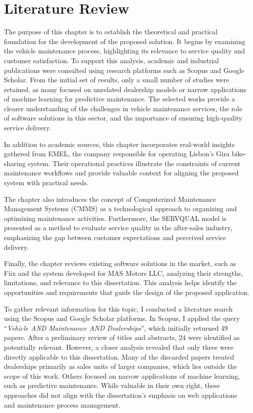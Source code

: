 \chapter{Literature Review}%
\label{chapter:literatureReview}

\begin{introduction}
The purpose of this chapter is to establish the theoretical and practical foundation for the development of the proposed solution. It begins by examining the vehicle maintenance process, highlighting its relevance to service quality and customer satisfaction. To support this analysis, academic and industrial publications were consulted using research platforms such as Scopus and Google Scholar. From the initial set of results, only a small number of studies were retained, as many focused on unrelated dealership models or narrow applications of machine learning for predictive maintenance. The selected works provide a clearer understanding of the challenges in vehicle maintenance services, the role of software solutions in this sector, and the importance of ensuring high-quality service delivery.

In addition to academic sources, this chapter incorporates real-world insights gathered from EMEL, the company responsible for operating Lisbon's Gira bike-sharing system. Their operational practices illustrate the constraints of current maintenance workflows and provide valuable context for aligning the proposed system with practical needs.

The chapter also introduces the concept of Computerized Maintenance Management Systems (CMMS) as a technological approach to organizing and optimizing maintenance activities. Furthermore, the SERVQUAL model is presented as a method to evaluate service quality in the after-sales industry, emphasizing the gap between customer expectations and perceived service delivery.

Finally, the chapter reviews existing software solutions in the market, such as Fiix and the system developed for MAS Motors LLC, analyzing their strengths, limitations, and relevance to this dissertation. This analysis helps identify the opportunities and requirements that guide the design of the proposed application.
\end{introduction} 

To gather relevant information for this topic, I conducted a literature search using the Scopus and Google Scholar platforms. In Scopus, I applied the query “\textit{Vehicle AND Maintenance AND Dealerships}”, which initially returned 49 papers. After a preliminary review of titles and abstracts, 24 were identified as potentially relevant. However, a closer analysis revealed that only three were directly applicable to this dissertation. Many of the discarded papers treated dealerships primarily as sales units of larger companies, which lies outside the scope of this work. Others focused on narrow applications of machine learning, such as predictive maintenance. While valuable in their own right, these approaches did not align with the dissertation's emphasis on web applications and maintenance process management.

